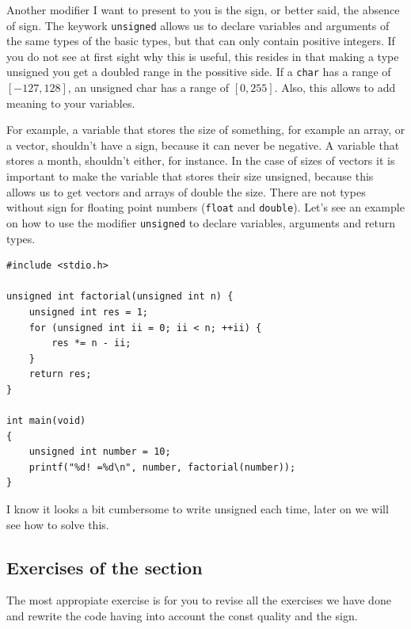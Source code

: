 \documentclass[a4paper]{article}
\begin{document}
Another modifier I want to present to you is the sign, or better said, the
absence of sign. The keywork \lstinline[style=C]!unsigned! allows us to
declare variables and arguments of the same types of the basic types, but that
can only contain positive integers. If you do not see at first sight why this is
useful, this resides in that making a type unsigned you get a doubled range in
the possitive side. If a \verb"char" has a range of $[-127, 128]$, an unsigned
char has a range of $[0, 255]$. Also, this allows to add meaning to your
variables.

For example, a variable that stores the size of something, for example an array,
or a vector, shouldn't have a sign, because it can never be negative. A variable
that stores a month, shouldn't either, for instance. In the case of sizes of
vectors it is important to make the variable that stores their size unsigned,
because this allows us to get vectors and arrays of double the size. There are
not types without sign for floating point numbers (\verb!float! and
\verb"double"). Let's see an example on how to use the modifier \verb!unsigned!
to declare variables, arguments and return types.

\noindent
\begin{minipage}[H]{\linewidth}
\mbox{}
\begin{lstlisting}[style=C,
caption={Use of unsigned types},
label={lst:unsignedTypes}]
#include <stdio.h>

unsigned int factorial(unsigned int n) {
    unsigned int res = 1;
    for (unsigned int ii = 0; ii < n; ++ii) {
        res *= n - ii;
    }
    return res;
}

int main(void)
{
    unsigned int number = 10;
    printf("%d! =%d\n", number, factorial(number));
}
\end{lstlisting}
\end{minipage}

I know it looks a bit cumbersome to write unsigned each time, later on we will
see how to solve this.

\subsection{Exercises of the section}
The most appropiate exercise is for you to revise all the exercises we have done
and rewrite the code having into account the const quality and the sign.
\end{document}
